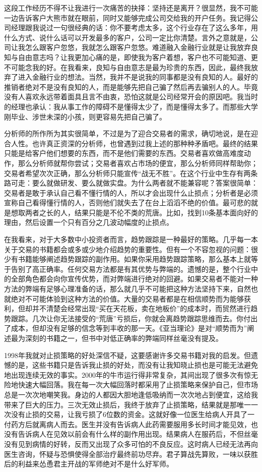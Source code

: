 这段工作经历不得不让我进行一次痛苦的抉择：坚持还是离开？很显然，我不可能一边告诉客户大熊市就在眼前，同时又能够完成公司交给我的开户任务。我记得公司经理跟我说过一句很经典的话：你不要考虑太多，这个行业存在了这么多年，用什么方式、说什么话可以开发最多的客户，公司一定比你清楚。言外之意就是，公司让我怎么跟客户忽悠，我就怎么跟客户忽悠。难道融入金融行业就是让我放弃良知与自由意志吗？让我更加心痛的是，即使我为客户着想，客户也不可能知道、更不可能念我的好。在我看来，良知与自由意志是最为珍贵的东西，因此，最终我放弃了进入金融行业的想法。当然，我并不是说我的同事都是没有良知的人。最好的推销者绝对不是没有良知的人，而是能够先把自己骗了然后再去骗别人的人。毕竟没有人喜欢永远带着面具且言不由衷，恐怕这就是公司经常开会的原因吧。我当时的经理也承认：我从事工作的障碍不是懂得太少了，而是懂得太多了。而那些大学刚毕业、涉世未深的小孩，则更容易先把自己骗了。

分析师的所作所为其实很简单，不过是为了迎合交易者的需求，确切地说，是在迎合人性。也许真正资深的分析师，也曾遇到过我上述的那种种矛盾吧。最终的结果只能是给客户他们想要的东西，而不是他们需要的东西。交易者喜欢做高难度动作，那么分析师就帮你尝试；交易者喜欢占市场的便宜，那么分析师同样帮助你；交易者希望次次正确，那么分析师只能宣传“战无不胜”。在这个行业中生存有两条路可走：要么就做研发、要么就做实盘。为什么两者就不能兼容呢？答案很简单：交易者是敢于承认自己看不懂行情的人，所以才会出现什么止损点；分析者是必须宣称自己看得懂行情的人，否则他们就失去了在台上滔滔不绝的价值。最可悲的就是想取两者之长的人，结果只能是不伦不类的荒唐。比如，找到10条基本面向好的理由，然后设置一个只有百分之几波动幅度的止损点。

在我看来，对于大多数中小投资者而言，趋势跟踪是一种最好的策略。几乎每一本关于交易的书籍都会或多或少地介绍趋势的重要性。但有一个不容忽视的问题：很少有书籍能够阐述趋势跟踪的副作用。如果你采用趋势跟踪策略，那么基本上就等于告别了高正确率。任何交易方法都是有其优势与弊端的。遗憾的是，整个行业中的全部角色都会向你宣传优势，而对弊端进行绝对的回避。如果交易者不能对一种方法的弊端有足够心理准备的话，那么就几乎不可能把这种方法坚持下来，自然也就绝对不可能体验到这种方法的价值。大量的交易者都是在相信顺势而为能够获利，但却并不清楚会经常出现“买在天花板，卖在地板价”的成本时，而贸然进行趋势跟踪。几次让你无法接受的“荒唐”亏损后，你就会离趋势跟踪思维而去。你付出了成本，但却没有足够的信念等到丰收的那一天。《亚当理论》是对“顺势而为”阐述最为深刻的书籍之一，但书中对低正确率的弊端同样丝毫没有提及。

1998年我就对止损策略的好处深信不疑，这要感谢许多交易书籍对我的启发。但遗憾的是，这些书籍只是告诉我止损的好处，而没有让我知晓止损也是可能无法避免地出现连续无效的事实。2000年的牛市运行得非常复杂，其间出现了很多次有惊无险地快速大幅回落。我在每一次大幅回落时都采用了止损策略来保护自己，但市场总是一次次地嘲笑我。身边的人都因大胆地逢低吸纳而一次次地占到便宜，这给我带来了巨大的压力。三次无效止损后，我终于放弃了止损策略，结果就是那唯一一次没有止损的交易，让我亏损了6位数的资金。这就好像一位医生给病人开具了一付药方后就离病人而去。医生并没有告诉病人此药需要服用多长时间才能见效，也没有告诉病人在见效以前会有什么样的副作用出现。结果病人在服药后，不但丝毫没有见到病情的好转，反而又出现了众多可怕的不良反应。这时病人已经无法再向医生咨询，怀疑与恐惧使得全部治疗最终前功尽弃。君子算战先算败，一味以获胜后的利益来怂恿君主开战的军师绝对不是什么好军师。

